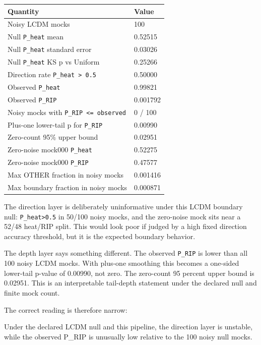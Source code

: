 \documentclass[
]{article}
\newenvironment{Shaded}{}{}
\newcommand{\NormalTok}[1]{#1}
\newcounter{none} %
\begin{document}
{\def\LTcaptype{none} %
\begin{longtable}[]{@{}ll@{}}
\toprule\noalign{}
Quantity & Value \\
\midrule\noalign{}
\endhead
\bottomrule\noalign{}
\endlastfoot
Noisy LCDM mocks & 100 \\
Null \texttt{P\_heat} mean & 0.52515 \\
Null \texttt{P\_heat} standard error & 0.03026 \\
Null \texttt{P\_heat} KS p vs Uniform & 0.25266 \\
Direction rate \texttt{P\_heat\ \textgreater{}\ 0.5} & 0.50000 \\
Observed \texttt{P\_heat} & 0.99821 \\
Observed \texttt{P\_RIP} & 0.001792 \\
Noisy mocks with \texttt{P\_RIP\ \textless{}=\ observed} & 0 / 100 \\
Plus-one lower-tail p for \texttt{P\_RIP} & 0.00990 \\
Zero-count 95\% upper bound & 0.02951 \\
Zero-noise mock000 \texttt{P\_heat} & 0.52275 \\
Zero-noise mock000 \texttt{P\_RIP} & 0.47577 \\
Max OTHER fraction in noisy mocks & 0.001416 \\
Max boundary fraction in noisy mocks & 0.000871 \\
\end{longtable}
}

The direction layer is deliberately uninformative under this LCDM
boundary null: \texttt{P\_heat\textgreater{}0.5} in 50/100 noisy mocks,
and the zero-noise mock sits near a 52/48 heat/RIP split. This would
look poor if judged by a high fixed direction accuracy threshold, but it
is the expected boundary behavior.

The depth layer says something different. The observed \texttt{P\_RIP}
is lower than all 100 noisy LCDM mocks. With plus-one smoothing this
becomes a one-sided lower-tail p-value of 0.00990, not zero. The
zero-count 95 percent upper bound is 0.02951. This is an interpretable
tail-depth statement under the declared null and finite mock count.

The correct reading is therefore narrow:

\begin{Shaded}
\begin{Highlighting}[]
\NormalTok{Under the declared LCDM null and this pipeline, the direction layer is unstable,}
\NormalTok{while the observed P\_RIP is unusually low relative to the 100 noisy null mocks.}
\end{Highlighting}
\end{Shaded}
\end{document}
